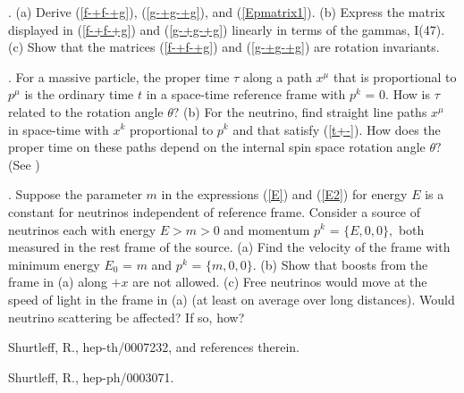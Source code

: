 \documentclass[a4paper,12pt]{article}
\begin{document}
. (a) Derive (\ref{f-+f-+g}), (\ref{g-+g-+g}), and (\ref{Epmatrix1}). (b) Express the matrix displayed in (\ref{f-+f-+g}) and (\ref{g-+g-+g}) linearly in terms of the gammas, I(47). (c) Show that the matrices (\ref{f-+f-+g}) and (\ref{g-+g-+g}) are rotation invariants.

\vspace{0.3cm}
. For a massive particle, the proper time $\tau$ along a path $x^{\mu}$ that is proportional to $p^{\mu}$ is the ordinary time $t$ in a space-time reference frame with $p^{k}$ = 0. How is $\tau$ related to the rotation angle $\theta?$ (b) For the neutrino, find straight line paths $x^{\mu}$ in space-time with $x^{k}$ proportional to $p^{k}$ and that satisfy (\ref{t+-}). How does the proper time on these paths depend on the internal spin space rotation angle $\theta?$ (See \cite{backnu})

\vspace{0.3cm}
. Suppose the parameter $m$ in the expressions (\ref{E}) and (\ref{E2}) for energy $E$ is a constant for neutrinos independent of reference frame. Consider a source of neutrinos each with energy $E > m > 0$ and momentum $p^{k}$ = $\{E,0,0\},$ both measured in the rest frame of the source. (a) Find the velocity of the frame with minimum energy $E_{0}$ = $m$ and $p^{k}$ = $\{m,0,0\}.$ (b) Show that boosts from the frame in (a) along $+x$ are not allowed. (c) Free neutrinos would move at the speed of light in the frame in (a) (at least on average over long distances). Would neutrino scattering be affected? If so, how?

\begin{thebibliography}{9}

 Shurtleff, R., hep-th/0007232, and references therein.

 Shurtleff, R., hep-ph/0003071.


\end{thebibliography}
\end{document}
